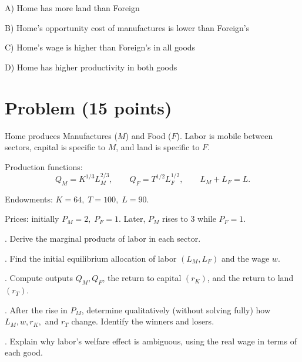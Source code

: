 \documentclass[12pt]{article}
\begin{document}
A) Home has more land than Foreign  

B) Home’s opportunity cost of manufactures is lower than Foreign’s  

C) Home’s wage is higher than Foreign’s in all goods  

D) Home has higher productivity in both goods  

\bigskip

\section*{Problem (15 points)}

\noindent Home produces Manufactures ($M$) and Food ($F$). Labor is mobile between sectors, capital is specific to $M$, and land is specific to $F$.  

\noindent Production functions:  
\[
Q_M = K^{1/3}L_M^{2/3}, 
\qquad 
Q_F = T^{1/2}L_F^{1/2}, 
\qquad 
L_M+L_F = L.
\]  

\noindent Endowments: $K=64,\; T=100,\; L=90$.  

\noindent Prices: initially $P_M=2,\; P_F=1$. Later, $P_M$ rises to $3$ while $P_F=1$.  

\bigskip

. Derive the marginal products of labor in each sector.  

\bigskip

. Find the initial equilibrium allocation of labor $(L_M,L_F)$ and the wage $w$.  

\bigskip

. Compute outputs $Q_M,Q_F$, the return to capital $(r_K)$, and the return to land $(r_T)$.  

\bigskip

. After the rise in $P_M$, determine qualitatively (without solving fully) how $L_M, w, r_K,$ and $r_T$ change. Identify the winners and losers.  

\bigskip

. Explain why labor’s welfare effect is ambiguous, using the real wage in terms of each good.  
\end{document}
